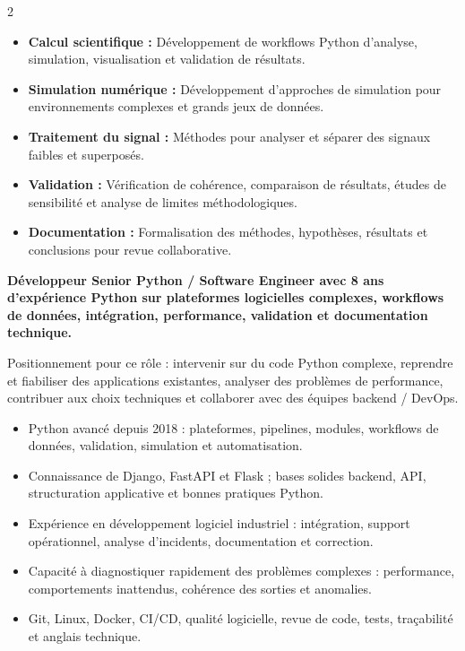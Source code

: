 \documentclass[8pt,a4paper,ragged2e,withhyper]{altacv}
\begin{document}
\begin{paracol}{2}
\begin{itemize}
  \item \textbf{Calcul scientifique :} Développement de workflows Python d’analyse, simulation, visualisation et validation de résultats.
  \item \textbf{Simulation numérique :} Développement d’approches de simulation pour environnements complexes et grands jeux de données.
  \item \textbf{Traitement du signal :} Méthodes pour analyser et séparer des signaux faibles et superposés.
  \item \textbf{Validation :} Vérification de cohérence, comparaison de résultats, études de sensibilité et analyse de limites méthodologiques.
  \item \textbf{Documentation :} Formalisation des méthodes, hypothèses, résultats et conclusions pour revue collaborative.
\end{itemize}

\switchcolumn


\textbf{Développeur Senior Python / Software Engineer avec 8 ans d’expérience Python sur plateformes logicielles complexes, workflows de données, intégration, performance, validation et documentation technique.}

Positionnement pour ce rôle : intervenir sur du code Python complexe, reprendre et fiabiliser des applications existantes, analyser des problèmes de performance, contribuer aux choix techniques et collaborer avec des équipes backend / DevOps.

\begin{itemize}
  \item Python avancé depuis 2018 : plateformes, pipelines, modules, workflows de données, validation, simulation et automatisation.
  \item Connaissance de Django, FastAPI et Flask ; bases solides backend, API, structuration applicative et bonnes pratiques Python.
  \item Expérience en développement logiciel industriel : intégration, support opérationnel, analyse d’incidents, documentation et correction.
  \item Capacité à diagnostiquer rapidement des problèmes complexes : performance, comportements inattendus, cohérence des sorties et anomalies.
  \item Git, Linux, Docker, CI/CD, qualité logicielle, revue de code, tests, traçabilité et anglais technique.
\end{itemize}


\end{paracol}
\end{document}
